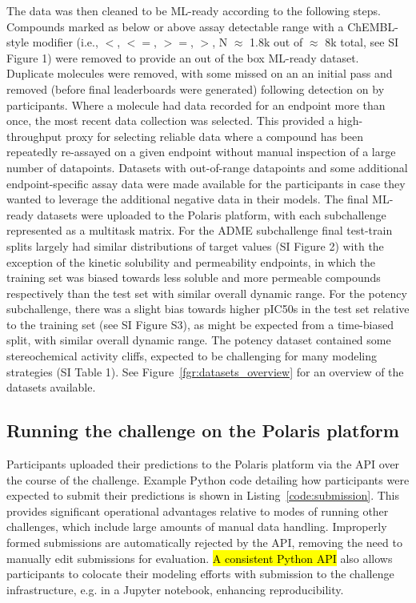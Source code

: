 \documentclass[journal=jcim,manuscript=article]{achemso}
\begin{document}
The data was then cleaned to be ML-ready according to the following steps. Compounds marked as below or above assay detectable range with a ChEMBL\cite{zdrazil_2024_chembl}-style modifier (i.e., $<$, $<=$, $>=$, $>$, N $\approx$ 1.8k out of $\approx$ 8k total, see SI Figure 1) were removed to provide an out of the box ML-ready dataset.  Duplicate molecules were removed, with some missed on an an initial pass and removed (before final leaderboards were generated) following detection on by participants. Where a molecule had data recorded for an endpoint more than once, the most recent data collection was selected. This provided a high-throughput proxy for selecting reliable data where a compound has been repeatedly re-assayed on a given  endpoint without manual inspection of a large number of datapoints. Datasets with out-of-range datapoints and some additional endpoint-specific assay data were made available for the participants in case they wanted to leverage the additional negative data in their models. The final ML-ready datasets were uploaded to the Polaris platform, with each subchallenge represented as a multitask matrix. For the ADME subchallenge final test-train splits largely had similar distributions of target values (SI Figure 2) with the exception of the kinetic solubility and permeability endpoints, in which the training set was biased towards less soluble and more permeable compounds respectively than the test set with similar overall dynamic range. For the potency subchallenge, there was a slight bias towards higher pIC50s in the test set relative to the training set (see SI Figure S3), as might be expected from a time-biased split, with similar overall dynamic range. The potency dataset contained some stereochemical activity cliffs, expected to be challenging for many modeling strategies (SI Table 1). See Figure~\ref{fgr:datasets_overview} for an overview of the datasets available.

\subsection{Running the challenge on the Polaris platform}

Participants uploaded their predictions to the Polaris platform via the API over the course of the challenge. Example Python code detailing how participants were expected to submit their predictions is shown in Listing~\ref{code:submission}. This provides significant operational advantages relative to modes of running other challenges, which include large amounts of manual data handling. Improperly formed submissions are automatically rejected by the API, removing the need to manually edit submissions for evaluation. \hl{A consistent Python API} also allows participants to colocate their modeling efforts with submission to the challenge infrastructure, e.g. in a Jupyter notebook\cite{kluyver_2016_jupyter}, enhancing reproducibility.
\end{document}
